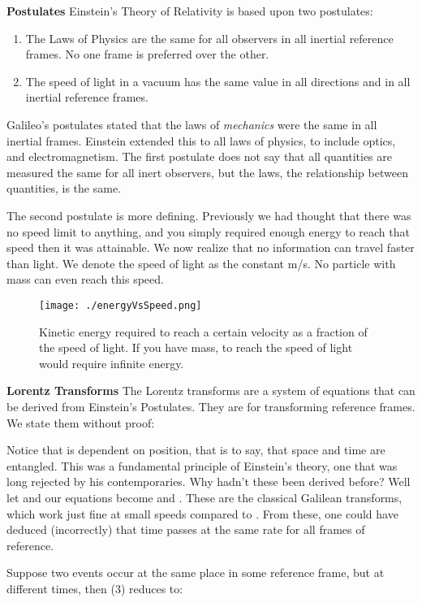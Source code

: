 \documentclass[conference]{IEEEtran}
\begin{document}
\textbf{Postulates} Einstein's Theory of Relativity is based upon two postulates: 
\begin{enumerate}
\item The Laws of Physics are the same for all observers in all inertial reference frames. No one frame is preferred over the other.
\item The speed of light in a vacuum has the same value  in all directions and in all inertial reference frames.
\end{enumerate} 

Galileo's postulates stated that the laws of \textit{mechanics} were the same in all inertial frames. Einstein extended this to all laws of physics, to include optics, and electromagnetism. The first postulate does not say that all quantities are measured the same for all inert observers, but the laws, the relationship between quantities, is the same. 

The second postulate is more defining. Previously we had thought that there was no speed limit to anything, and you simply required enough energy to reach that speed then it was attainable. We now realize that no information can travel faster than light. We denote the speed of light as the constant m/s. No particle with mass can even reach this speed. \cite{einstein}
\begin{figure}[ht!]
\texttt{[image: ./energyVsSpeed.png]} 
\caption{Kinetic energy required to reach a certain velocity as a fraction of the speed of light. If you have mass, to reach the speed of light would require infinite energy.}
\end{figure}

\textbf{Lorentz Transforms} The Lorentz transforms are a system of equations that can be derived from Einstein's Postulates. They are for transforming reference frames. We state them without proof:



Notice that  is dependent on position, that is to say, that space and time are entangled. This was a fundamental principle of Einstein's theory, one that was long rejected by his contemporaries. Why hadn't these been derived before? Well let  and our equations become  and . These are the classical Galilean transforms, which work just fine at small speeds compared to . From these, one could have deduced (incorrectly) that time passes at the same rate for all frames of reference. \cite{lorentz}

Suppose two events occur at the same place in some reference frame, but at different times, then (3) reduces to:
\end{document}
